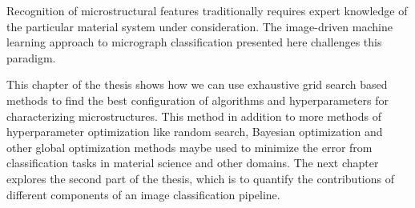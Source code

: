 %
Recognition of microstructural features traditionally requires expert knowledge of the particular material system under consideration.  The image-driven machine learning approach to micrograph classification presented here challenges this paradigm. 

This chapter of the thesis shows how we can use exhaustive grid search based methods to find the best configuration of algorithms and hyperparameters for characterizing microstructures. This method in addition to more methods of hyperparameter optimization like random search, Bayesian optimization and other global optimization methods maybe used to minimize the error from classification tasks in material science and other domains. The next chapter explores the second part of the thesis, which is to quantify the contributions of different components of an image classification pipeline.


%
